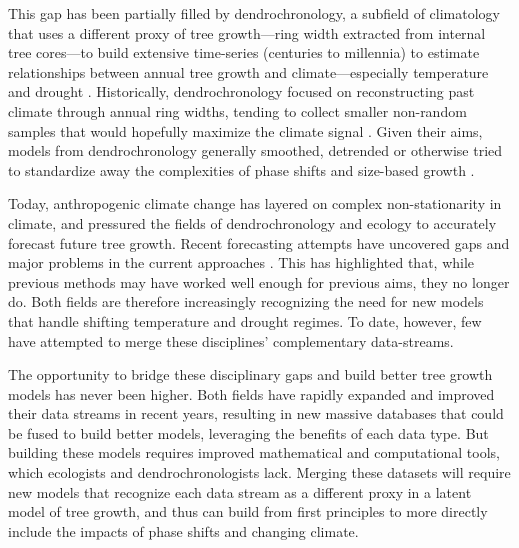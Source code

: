 \documentclass[11pt]{article}
\begin{document}
This gap has been partially filled by dendrochronology, a subfield of climatology that uses a different proxy of tree growth---ring width extracted from internal tree cores---to build extensive time-series (centuries to millennia) to estimate relationships between annual tree growth and climate---especially temperature and drought \citep{cook2013methods}. Historically, dendrochronology focused on reconstructing past climate through annual ring widths, tending to collect smaller non-random samples that would hopefully maximize the climate signal \citep[e.g., sampling has focused on larger trees in more extreme environmental conditions;][]{manzanedo2019towards}. Given their aims, models from dendrochronology generally smoothed, detrended or otherwise tried to standardize away the complexities of phase shifts and size-based growth \citep{schofield2016model}. 

Today, anthropogenic climate change has layered on complex non-stationarity in climate, and pressured the fields of dendrochronology and ecology to accurately forecast future tree growth. Recent forecasting attempts have uncovered gaps and major problems in the current approaches \citep[e.g., the `divergence problem' in dendrochonology,][]{d2008divergence}. This has highlighted that, while previous methods may have worked well enough for previous aims, they no longer do. Both fields are therefore increasingly recognizing the need for new models that handle shifting temperature and drought regimes. To date, however, few have attempted to merge these disciplines' complementary data-streams. 

The opportunity to bridge these disciplinary gaps and build better tree growth models has never been higher. Both fields have rapidly expanded and improved their data streams in recent years, resulting in new massive databases that could be fused to build better models, leveraging the benefits of each data type. But building these models requires improved mathematical and computational tools, which ecologists and dendrochronologists lack. Merging these datasets will require new models that recognize each data stream as a different proxy in a latent model of tree growth, and thus can build from first principles to more directly include the impacts of phase shifts and changing climate.  %
\end{document}
